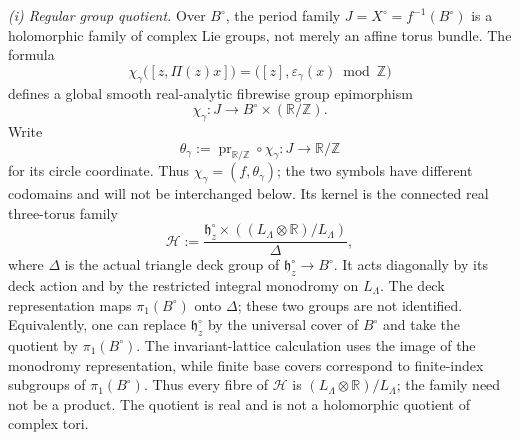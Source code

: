 \begin{theorem}
\smallskip
\noindent
\emph{(i) Regular group quotient.}
Over \(B^\circ\), the period family \(J=X^\circ=f^{-1}(B^\circ)\) is a
holomorphic family of complex Lie groups, not merely an affine torus
bundle.  The formula
\begin{equation}
 \chi_\gamma\bigl([z,\Pi(z)x]\bigr)
 =\bigl([z],\varepsilon_\gamma(x)\bmod\mathbb Z\bigr)
 \label{wb:cusp-spec-global-circle-map}
\end{equation}
defines a global smooth real-analytic fibrewise group epimorphism
\begin{equation}
 \chi_\gamma:J\longrightarrow B^\circ\times(\mathbb R/\mathbb Z).
 \label{wb:cusp-spec-global-circle-quotient}
\end{equation}
Write
\begin{equation}
 \theta_\gamma:=\operatorname{pr}_{\mathbb R/\mathbb Z}\circ\chi_\gamma:
 J\longrightarrow\mathbb R/\mathbb Z
 \label{wb:cusp-spec-global-circle-coordinate}
\end{equation}
for its circle coordinate.  Thus
\(\chi_\gamma=(f,\theta_\gamma)\); the two symbols have different
codomains and will not be interchanged below.
Its kernel is the connected real three-torus family
\begin{equation}
 \mathcal H:=
 \frac{\mathfrak h_z^\circ\times
       ((L_\Lambda\otimes\mathbb R)/L_\Lambda)}{\Delta},
 \label{wb:cusp-spec-global-kernel-family}
\end{equation}
where \(\Delta\) is the actual triangle deck group of
\(\mathfrak h_z^\circ\to B^\circ\).  It acts diagonally by its deck action
and by the restricted integral monodromy on \(L_\Lambda\).
The deck representation maps \(\pi_1(B^\circ)\) onto \(\Delta\);
these two groups are not identified.  Equivalently, one can replace
\(\mathfrak h_z^\circ\) by the universal cover of \(B^\circ\) and
take the quotient by \(\pi_1(B^\circ)\).
The invariant-lattice calculation uses the image of the monodromy
representation, while finite base covers correspond to finite-index
subgroups of \(\pi_1(B^\circ)\).  Thus every fibre of \(\mathcal H\) is
\((L_\Lambda\otimes\mathbb R)/L_\Lambda\); the family need not be a
product.
The quotient is real and is not a holomorphic quotient of complex tori.


\end{theorem}
